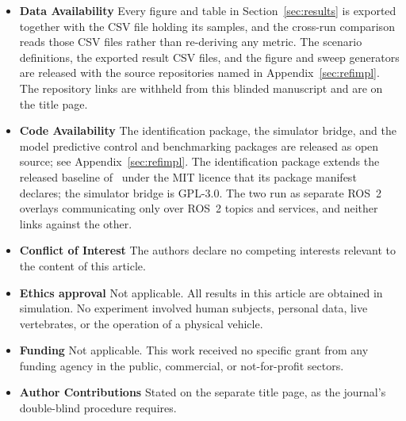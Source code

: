 \documentclass[lineno,12pt]{sn-jnl}
\theoremstyle{thmstyleone}%
\theoremstyle{thmstyletwo}%
\theoremstyle{thmstylethree}%
\begin{document}
\begin{itemize}
\item \textbf{Data Availability}
Every figure and table in Section~\ref{sec:results} is exported together with
the CSV file holding its samples, and the cross-run comparison reads those CSV
files rather than re-deriving any metric. The scenario definitions, the
exported result CSV files, and the figure and sweep generators are released
with the source repositories named in Appendix~\ref{sec:refimpl}. The
repository links are withheld from this blinded manuscript and are on the
title page.

\item \textbf{Code Availability}
The identification package, the simulator bridge, and the model predictive
control and benchmarking packages are released as open source; see
Appendix~\ref{sec:refimpl}. The identification package extends the released
baseline of~\cite{ontrack2025} under the MIT licence that its package manifest
declares; the simulator bridge is GPL-3.0. The two run as separate ROS~2
overlays communicating only over ROS~2 topics and services, and neither links
against the other.

\item \textbf{Conflict of Interest}
The authors declare no competing interests relevant to the content of this
article.

\item \textbf{Ethics approval}
Not applicable. All results in this article are obtained in simulation. No
experiment involved human subjects, personal data, live vertebrates, or the
operation of a physical vehicle.

\item \textbf{Funding}
Not applicable. This work received no specific grant from any funding agency in
the public, commercial, or not-for-profit sectors.

\item \textbf{Author Contributions}
Stated on the separate title page, as the journal's double-blind procedure
requires.
\end{itemize}
\end{document}
